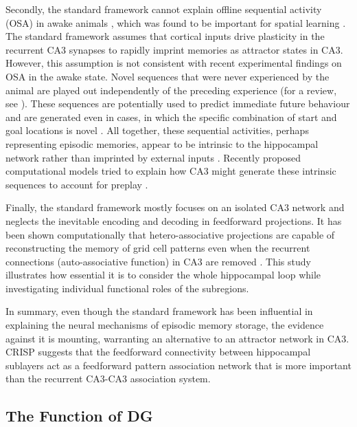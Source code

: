 \documentclass[utf8]{frontiersSCNS} %
\begin{document}
Secondly, the standard framework cannot explain offline sequential activity (OSA) in awake animals \cite{cheng2013crisp}, which was found to be important for spatial learning \cite{jadhav2012awake}. The standard framework assumes that cortical inputs drive plasticity in the recurrent CA3 synapses to rapidly imprint memories as attractor states in CA3. However, this assumption is not consistent with recent experimental findings on OSA in the awake state. Novel sequences that were never experienced by the animal are played out independently of the preceding experience \cite{gupta2010hippocampal} (for a review, see \cite{dragoi2011preplay}). These sequences are potentially used to predict immediate future behaviour and are generated even in cases, in which the specific combination of start and goal locations is novel \cite{pfeiffer2013hippocampal}. All together, these sequential activities, perhaps representing episodic memories, appear to be intrinsic to the hippocampal network rather than imprinted by external inputs \cite{cheng2013crisp}. Recently proposed computational models tried to explain how CA3 might generate these intrinsic sequences to account for preplay \cite{azizi2013computational, romani2015short}. 


Finally, the standard framework mostly focuses on an isolated CA3 network and neglects the inevitable encoding and decoding in feedforward projections. It has been shown computationally that hetero-associative projections are capable of reconstructing the memory of grid cell patterns even when the recurrent connections (auto-associative function) in CA3 are removed \cite{neher2015memory}. This study illustrates how essential it is to consider the whole hippocampal loop while investigating individual functional roles of the subregions. 

In summary, even though the standard framework has been influential in explaining the neural mechanisms of episodic memory storage, the evidence against it is mounting, warranting an alternative to an attractor network in CA3. CRISP suggests that the feedforward connectivity between hippocampal sublayers act as a feedforward pattern association network that is more important than the recurrent CA3-CA3 association system. 



\subsection{The Function of DG}
\end{document}
